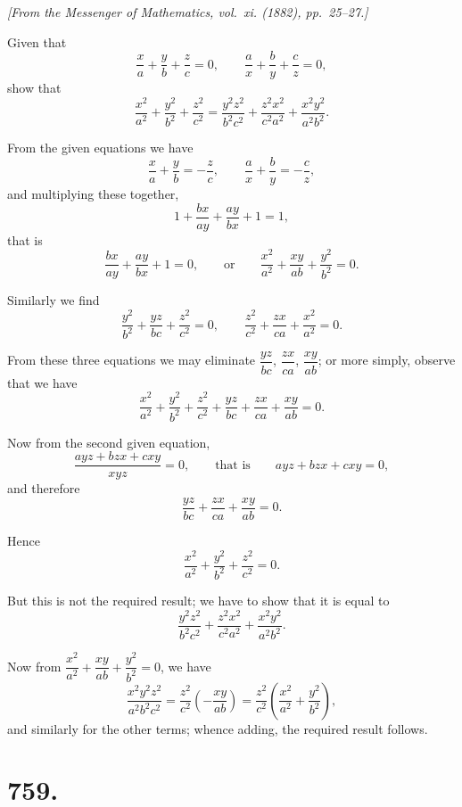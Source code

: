 \documentclass[11pt,a4paper]{book}
\begin{document}
\begin{flushright}
\textit{[From the Messenger of Mathematics, vol.~xi. (1882), pp.~25--27.]}
\end{flushright}

Given that
%
\[
\frac{x}{a} + \frac{y}{b} + \frac{z}{c} = 0,
\qquad
\frac{a}{x} + \frac{b}{y} + \frac{c}{z} = 0,
\]
show that
%
\[
\frac{x^2}{a^2} + \frac{y^2}{b^2} + \frac{z^2}{c^2}
= \frac{y^2 z^2}{b^2 c^2} + \frac{z^2 x^2}{c^2 a^2} + \frac{x^2 y^2}{a^2 b^2}.
\]

From the given equations we have
%
\[
\frac{x}{a} + \frac{y}{b} = -\frac{z}{c},
\qquad
\frac{a}{x} + \frac{b}{y} = -\frac{c}{z},
\]
%
and multiplying these together,
%
\[
1 + \frac{bx}{ay} + \frac{ay}{bx} + 1 = 1,
\]
%
that is
%
\[
\frac{bx}{ay} + \frac{ay}{bx} + 1 = 0,
\qquad \text{or} \qquad
\frac{x^2}{a^2} + \frac{xy}{ab} + \frac{y^2}{b^2} = 0.
\]

Similarly we find
%
\[
\frac{y^2}{b^2} + \frac{yz}{bc} + \frac{z^2}{c^2} = 0,
\qquad
\frac{z^2}{c^2} + \frac{zx}{ca} + \frac{x^2}{a^2} = 0.
\]

From these three equations we may eliminate $\dfrac{yz}{bc}$,
$\dfrac{zx}{ca}$, $\dfrac{xy}{ab}$; or more simply, observe that we have
%
\[
\frac{x^2}{a^2} + \frac{y^2}{b^2} + \frac{z^2}{c^2}
+ \frac{yz}{bc} + \frac{zx}{ca} + \frac{xy}{ab} = 0.
\]

Now from the second given equation,
%
\[
\frac{ayz + bzx + cxy}{xyz} = 0,
\qquad \text{that is} \qquad
ayz + bzx + cxy = 0,
\]
%
and therefore
%
\[
\frac{yz}{bc} + \frac{zx}{ca} + \frac{xy}{ab} = 0.
\]

Hence
%
\[
\frac{x^2}{a^2} + \frac{y^2}{b^2} + \frac{z^2}{c^2} = 0.
\]

But this is not the required result; we have to show that it is equal to
%
\[
\frac{y^2 z^2}{b^2 c^2} + \frac{z^2 x^2}{c^2 a^2} + \frac{x^2 y^2}{a^2 b^2}.
\]

Now from $\dfrac{x^2}{a^2} + \dfrac{xy}{ab} + \dfrac{y^2}{b^2} = 0$, we have
%
\[
\frac{x^2 y^2 z^2}{a^2 b^2 c^2}
= \frac{z^2}{c^2} \left( -\frac{xy}{ab} \right)
= \frac{z^2}{c^2} \left( \frac{x^2}{a^2} + \frac{y^2}{b^2} \right),
\]
%
and similarly for the other terms; whence adding, the required result follows.

\newpage

\section*{759.}
\end{document}
